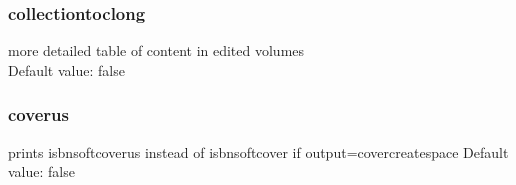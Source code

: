 \documentclass[guidelines]{langscibook}
\begin{document}
\subsubsection{collectiontoclong}
more detailed table of content in edited volumes\\
Default value: false  
\subsubsection{coverus}
prints isbnsoftcoverus instead of isbnsoftcover if output=covercreatespace
Default value: false  




\backmatter
{}%
\printbibliography[heading=references] 
\cleardoublepage
{} 
{} 
\printindex 
\cleardoublepage
{} 
{}
\printindex[lan] 
\cleardoublepage  
{} 
{}
\printindex[sbj]
\ohead{} 
\end{document}

